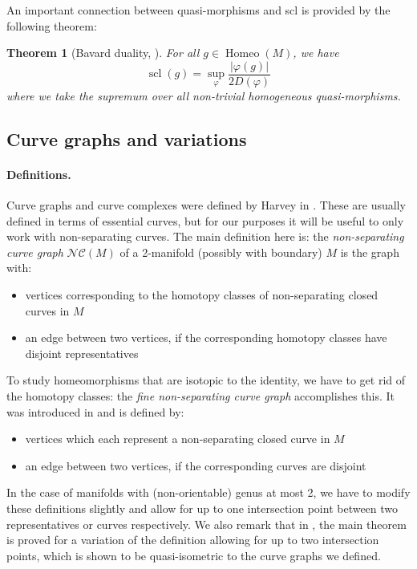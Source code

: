 \documentclass[a4paper]{article}
\let\phi\varphi %
\newtheorem{theorem}{Theorem}[section]
\newcommand{\ncg}{\mathcal{NC}}
\begin{document}
An important connection between quasi-morphisms and scl is provided by the following theorem:
\begin{theorem}[Bavard duality, \cite{bavard}]\label{thm:bavard-duality}
    For all $g\in \operatorname{Homeo}(M)$, we have
    \[\operatorname{scl}(g) = \sup_\phi \frac{\lvert \phi(g)\rvert}{2D(\phi)}\]
    where we take the supremum over all non-trivial homogeneous quasi-morphisms.
\end{theorem}

\subsection{Curve graphs and variations}
\paragraph{Definitions.}
Curve graphs and curve complexes were defined by Harvey in \cite{Harvey}.
These are usually defined in terms of essential curves, but for our purposes it will be useful to only work with non-separating curves.
The main definition here is:
the \emph{non-separating curve graph} $\ncg(M)$ of a 2-manifold (possibly with boundary) $M$ is the graph with: \begin{itemize}
    \item vertices corresponding to the homotopy classes of non-separating closed curves in $M$
    \item an edge between two vertices, if the corresponding homotopy classes have disjoint representatives
\end{itemize}
To study homeomorphisms that are isotopic to the identity, we have to get rid of the homotopy classes:
the \emph{fine non-separating curve graph} accomplishes this.
It was introduced in \cite{BHW1} and is defined by:\begin{itemize}
    \item vertices which each represent a non-separating closed curve in $M$
    \item an edge between two vertices, if the corresponding curves are disjoint
\end{itemize}

In the case of manifolds with (non-orientable) genus at most 2, we have to modify these definitions slightly and allow for up to one intersection point between two representatives or curves respectively.
We also remark that in \cite{kuno-hyperbolicity}, the main theorem is proved for a variation of the definition allowing for up to two intersection points, which is shown to be quasi-isometric to the curve graphs we defined.
\end{document}
